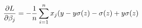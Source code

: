 \documentclass[preview]{standalone}
\begin{document}
\begin{align*}
\special{dvisvgm:raw <g id='unique000'>}\frac{\partial{L}}{\partial\beta_j}=-\frac{1}{n}\sum^n_{i=1}x_j(y-y\sigma(z)-\sigma(z)+y\sigma(z)\special{dvisvgm:raw </g>}
\end{align*}
\end{document}
